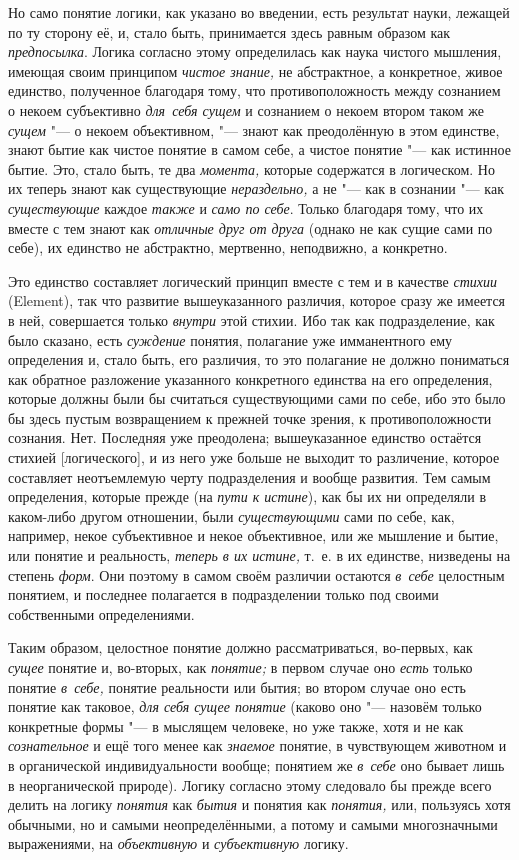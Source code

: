 Но само понятие логики, как указано во введении, есть результат науки,
лежащей по ту сторону её, и, стало быть, принимается здесь равным образом
как {\em предпосылка}. Логика согласно этому
определилась как наука чистого мышления, имеющая своим принципом
{\em чистое знание,} не абстрактное, а конкретное,
живое единство, полученное благодаря тому, что
противоположность между сознанием о некоем субъективно {\em для~себя сущем}
и сознанием о некоем втором таком же {\em сущем} "--- о некоем
объективном, "--- знают как преодолённую в этом единстве, знают бытие как
чистое понятие в самом себе, а чистое понятие "--- как истинное бытие.
Это, стало быть, те два
{\em момента,} которые содержатся в логическом. Но их теперь знают как
существующие {\em нераздельно,} а
не "--- как в сознании "--- как {\em существующие} каждое {\em также} и
{\em само по себе}. Только благодаря тому, что их вместе с тем знают как
{\em отличные друг от друга} (однако не как сущие сами по
себе), их единство не абстрактно, мертвенно, неподвижно, а конкретно.

Это единство составляет логический принцип вместе с тем и в качестве
{\em стихии} (Ele\-ment), так что развитие вышеуказанного
различия, которое сразу же имеется в ней, совершается только
{\em внутри} этой стихии. Ибо так как подразделение,
как было сказано, есть {\em суждение} понятия,
полагание уже имманентного ему определения и, стало быть, его различия, то
это полагание не должно пониматься как обратное разложение указанного
конкретного единства на его определения, которые должны были бы считаться
существующими сами по себе, ибо это было бы здесь пустым возвращением к
прежней точке зрения, к противоположности сознания. Нет. Последняя уже
преодолена; вышеуказанное единство остаётся стихией [логического], и из
него уже больше не выходит то различение, которое составляет неотъемлемую
черту подразделения и вообще развития. Тем самым определения, которые
прежде (на {\em пути к истине}), как бы их ни
определяли в каком-либо другом отношении, были
{\em существующими} сами по себе, как, например, некое
субъективное и некое объективное, или же мышление и бытие, или понятие и
реальность, {\em теперь в их истине,} т.~е. в их
единстве, низведены на степень {\em форм}. Они поэтому
в самом своём различии остаются {\em в~себе} целостным
понятием, и последнее полагается в подразделении только под своими
собственными определениями.

Таким образом, целостное понятие должно рассматриваться, во-первых, как
{\em сущее} понятие и, во-вторых, как {\em понятие;} в первом случае оно
{\em есть} только понятие {\em в~себе,} понятие реальности или бытия;
во втором случае оно есть понятие как таковое, {\em для себя сущее понятие}
(каково оно "--- назовём только конкретные формы "--- в мыслящем человеке,
но уже также, хотя и не как {\em сознательное} и ещё того менее как
{\em знаемое} понятие, в чувствующем животном и в
органической индивидуальности вообще; понятием же
{\em в~себе} оно бывает лишь в неорганической природе).
Логику согласно этому следовало бы прежде всего делить на логику
{\em понятия} как {\em бытия} и понятия как {\em понятия,} или, пользуясь
хотя обычными, но и самыми неопределёнными, а потому и самыми многозначными
выражениями, на {\em объективную} и {\em субъективную} логику.

